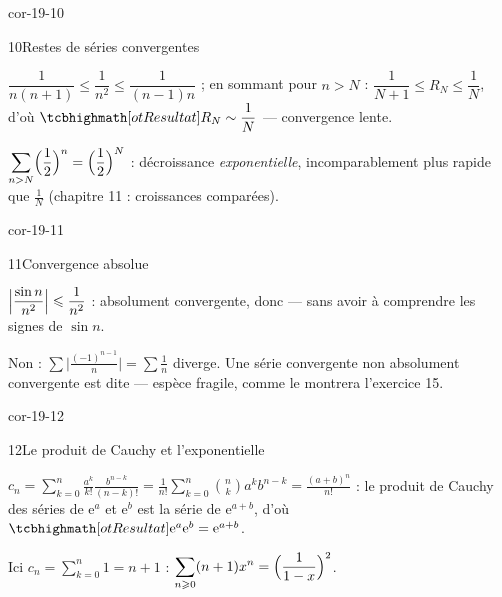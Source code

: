 \begin{blocLivre}{cor-19-10}
\begin{corrige}{10}{Restes de séries convergentes}
\begin{questions}
  \item $\dfrac{1}{n(n+1)}\leqslant\dfrac{1}{n^{2}}\leqslant
    \dfrac{1}{(n-1)n}$ ; en sommant pour $n>N$ :
    $\dfrac{1}{N+1}\leqslant R_N\leqslant\dfrac1N$, d'où
    $\res{R_N\sim\dfrac1N}$ — convergence lente.
  \item $\displaystyle\sum_{n>N}\Bigl(\frac12\Bigr)^{n}
    =\Bigl(\frac12\Bigr)^{N}$ : décroissance \emph{exponentielle},
    incomparablement plus rapide que $\frac1N$ (chapitre 11 :
    croissances comparées).
\end{questions}
\end{corrige}
\end{blocLivre}

\begin{blocLivre}{cor-19-11}
\begin{corrige}{11}{Convergence absolue}
\begin{questions}
  \item $\Bigl|\dfrac{\sin n}{n^{2}}\Bigr|\leqslant\dfrac{1}{n^{2}}$ :
    absolument convergente, donc  — sans avoir à
    comprendre les signes de $\sin n$.
  \item Non : $\sum\bigl|\tfrac{(-1)^{n-1}}{n}\bigr|=\sum\tfrac1n$
    diverge. Une série convergente non absolument convergente est dite
     — espèce fragile, comme le montrera
    l'exercice 15.
\end{questions}
\end{corrige}
\end{blocLivre}

\begin{blocLivre}{cor-19-12}
\begin{corrige}{12}{Le produit de Cauchy et l'exponentielle}
\begin{questions}
  \item $c_n=\displaystyle\sum_{k=0}^{n}\frac{a^{k}}{k!}
    \frac{b^{n-k}}{(n-k)!}
    =\frac{1}{n!}\sum_{k=0}^{n}\binom nk a^{k}b^{n-k}
    =\frac{(a+b)^{n}}{n!}$ : le produit de Cauchy des séries de
    $\mathrm{e}^{a}$ et $\mathrm{e}^{b}$ est la série de
    $\mathrm{e}^{a+b}$, d'où
    $\res{\mathrm{e}^{a}\mathrm{e}^{b}=\mathrm{e}^{a+b}}$.
  \item Ici $c_n=\sum_{k=0}^{n}1=n+1$ :
    $\displaystyle\sum_{n\geqslant0}(n+1)x^{n}
    =\Bigl(\frac{1}{1-x}\Bigr)^{2}$.
\end{questions}
\end{corrige}
\end{blocLivre}

